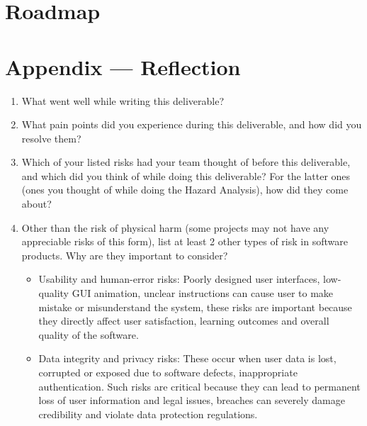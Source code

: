 \documentclass{article}
\begin{document}
\section{Roadmap}


\newpage{}

\section*{Appendix --- Reflection}




\begin{enumerate}
    \item What went well while writing this deliverable? 
    \item What pain points did you experience during this deliverable, and how
    did you resolve them?
    \item Which of your listed risks had your team thought of before this
    deliverable, and which did you think of while doing this deliverable? For
    the latter ones (ones you thought of while doing the Hazard Analysis), how
    did they come about?
    \item Other than the risk of physical harm (some projects may not have any
    appreciable risks of this form), list at least 2 other types of risk in
    software products. Why are they important to consider? 
	\begin{itemize}
	\item Usability and human-error risks: Poorly designed user interfaces, low-quality GUI animation, unclear instructions can cause user to make mistake or misunderstand the system, these risks are important because they directly affect user satisfaction, learning outcomes and overall quality of the software.
	\item Data integrity and privacy risks: These occur when user data is lost, corrupted or exposed due to software defects, inappropriate authentication. Such risks are critical because they can lead to permanent loss of user information and legal issues, breaches can severely damage credibility and violate data protection regulations.
	
	\end{itemize}
\end{enumerate}
\end{document}
